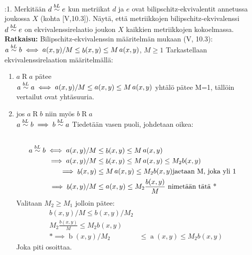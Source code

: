 \documentclass[12pt,a4paper,leqno]{amsart}
\begin{document}
:1. Merkitään $d \buildrel{bL}\over\sim e$ kun metriikat $d$ ja $e$ ovat bilipschitz-ekvivalentit 
annetussa joukossa $X$ (kohta  [V,10.3]). Näytä, että metriikkojen bilipschitz-ekvivalenssi $d \buildrel{bL}\over\sim  e$
on ekvivalenssirelaatio joukon $X$ kaikkien metriikkojen kokoelmassa.
\\
\textbf{Ratkaisu: }
Bilipschitz-ekvivalenssin määritelmän mukaan (V, 10.3): 
$a \buildrel{bL}\over\sim b \iff \mathop{a}(x, y)/M \leq \mathop{b}(x, y) \leq M \mathop{a}(x, y)$, $M \geq 1$
Tarkastellaan ekvivalenssirelaation määritelmällä:
\begin{enumerate}
    \item $a\mathop{R}a$ pätee \\

$a \buildrel{bL}\over\sim a \iff \mathop{a}(x, y)/M \leq \mathop{a}(x, y) \leq M \mathop{a}(x, y)$ yhtälö pätee M=1, tällöin vertailut ovat yhtäsuuria.

    \item jos $a\mathop{R}b$ niin myös $b\mathop{R}a$ \\
    $a \buildrel{bL}\over\sim b \implies b \buildrel{bL}\over\sim a$ Tiedetään vasen puoli, johdetaan oikea: 
\begin{align*}\\
    a \buildrel{bL}\over\sim b \iff \mathop{a}(x, y)/M & \leq \mathop{b}(x, y) \leq M \mathop{a}(x, y) 
\\ \implies \mathop{a}(x, y)/M & \leq \mathop{b}(x, y) \leq M \mathop{a}(x, y) \leq M_2 b(x, y)
\\ \implies \mathop{b}(x, y) & \leq M \mathop{a}(x, y) \leq M_2 b(x, y)
\text{jaetaan M, joka yli 1}
\\ \implies \mathop{b}(x, y) /M & \leq \mathop{a}(x, y) \leq M_2 \frac{b(x, y)}{M} \text{ nimetään tätä *}
\end{align*}
Valitaan $M_2 \geq M_1$ jolloin pätee:
\begin{align*}
b(x, y) /M \leq b(x, y) / M_2 &
\\ M_2 \frac{b(x, y)}{M} \leq M_2 b(x, y) &
\\ * \implies \mathop{b}(x, y) /M_2 & \leq \mathop{a}(x, y) \leq M_2 b(x, y)
        \end{align*}
Joka piti osoittaa.


\end{enumerate}
\end{document}
